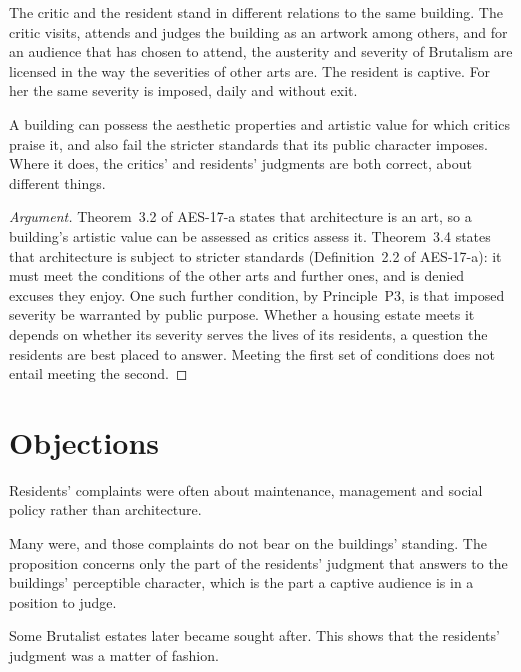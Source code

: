 \documentclass{situationist-preprint}
\begin{document}
The critic and the resident stand in different relations to the same building. The critic visits, attends and judges the building as an artwork among others, and for an audience that has chosen to attend, the austerity and severity of Brutalism are licensed in the way the severities of other arts are. The resident is captive. For her the same severity is imposed, daily and without exit.

\begin{proposition}\label{p:split}
A building can possess the aesthetic properties and artistic value for which critics praise it, and also fail the stricter standards that its public character imposes. Where it does, the critics' and residents' judgments are both correct, about different things.
\end{proposition}

\begin{proof}[Argument]
Theorem~3.2 of AES-17-a states that architecture is an art, so a building's artistic value can be assessed as critics assess it. Theorem~3.4 states that architecture is subject to stricter standards (Definition~2.2 of AES-17-a): it must meet the conditions of the other arts and further ones, and is denied excuses they enjoy. One such further condition, by Principle~P3, is that imposed severity be warranted by public purpose. Whether a housing estate meets it depends on whether its severity serves the lives of its residents, a question the residents are best placed to answer. Meeting the first set of conditions does not entail meeting the second.
\end{proof}

\section{Objections}

\begin{objection}
Residents' complaints were often about maintenance, management and social policy rather than architecture.
\end{objection}

\begin{reply}
Many were, and those complaints do not bear on the buildings' standing. The proposition concerns only the part of the residents' judgment that answers to the buildings' perceptible character, which is the part a captive audience is in a position to judge.
\end{reply}

\begin{objection}
Some Brutalist estates later became sought after. This shows that the residents' judgment was a matter of fashion.
\end{objection}
\end{document}
